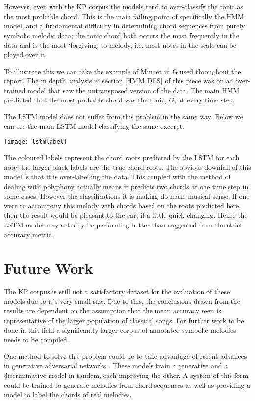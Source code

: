 \documentclass[bsc,singlespacing,logo, parskip, deptreport]{infthesis}
\begin{document}
However, even with the KP corpus the models tend to over-classify the tonic as the most probable chord. This is the main failing point of specifically the HMM model, and a fundamental difficulty in determining chord sequences from purely symbolic melodic data; the tonic chord both occurs the most frequently in the data and is the most `forgiving' to melody, i.e. most notes in the scale can be played over it.

To illustrate this we can take the example of Minuet in G used throughout the report. The in depth analysis in section \ref{HMM DES} of this piece was on an over-trained model that saw the untransposed version of the data. The main HMM predicted that the most probable chord was the tonic, $G$, at every time step.

The LSTM model does not suffer from this problem in the same way. Below we can see the main LSTM model classifying the same excerpt.

\begin{center}
\texttt{[image: lstmlabel]}
\end{center}

The coloured labels represent the chord roots predicted by the LSTM for each note, the larger black labels are the true chord roots. The obvious downfall of this model is that it is over-labelling the data. This coupled with the method of dealing with polyphony actually means it predicts two chords at one time step in some cases. However the classifications it is making do make musical sense. If one were to accompany this melody with chords based on the roots predicted here, then the result would be pleasant to the ear, if a little quick changing. Hence the LSTM model may actually be performing better than suggested from the strict accuracy metric.

\section{Future Work}

The KP corpus is still not a satisfactory dataset for the evaluation of these models due to it's very small size. Due to this, the conclusions drawn from the results are dependent on the assumption that the mean accuracy seen is representative of the larger population of classical songs. For further work to be done in this field a significantly larger corpus of annotated symbolic melodies needs to be compiled.

One method to solve this problem could be to take advantage of recent advances in generative adversarial networks \cite{goodfellow2014generative}. These models train a generative and a discriminative model in tandem, each improving the other. A system of this form could be trained to generate melodies from chord sequences as well as providing a model to label the chords of real melodies.
\end{document}

